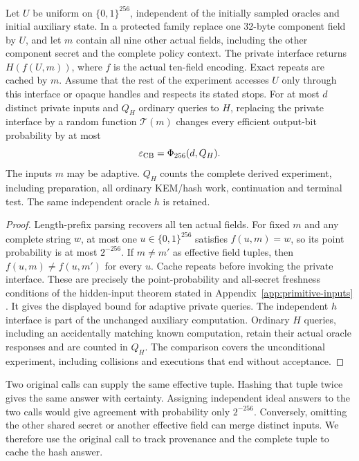 \begin{lemma}
\label{lem:cb-hidden-component}
Let $U$ be uniform on $\{0,1\}^{256}$, independent of the initially sampled
oracles and initial auxiliary state. In a protected family replace one
32-byte component field by $U$, and let $m$ contain all nine other actual
fields, including the other component secret and the complete policy
context. The private interface returns
$H(f(U,m))$, where $f$ is the actual ten-field encoding. Exact repeats are
cached by $m$. Assume that the rest of the experiment accesses $U$ only
through this interface or opaque handles and respects its stated stops.
For at most $d$ distinct private inputs and $Q_H$ ordinary queries to $H$,
replacing the private interface by a random function $\mathcal T(m)$
changes every efficient output-bit probability by at most
\begin{equation}
 \varepsilon_{\rm CB}=\Phi_{256}(d,Q_H).
 \label{eq:cb-hidden-cost}
\end{equation}
The inputs $m$ may be adaptive. $Q_H$ counts the complete derived
experiment, including preparation, all ordinary KEM/hash work, continuation
and terminal test. The same independent oracle $h$ is retained.
\end{lemma}
\begin{proof}
Length-prefix parsing recovers all ten actual fields. For fixed $m$ and any
complete string $w$, at most one $u\in\{0,1\}^{256}$ satisfies
$f(u,m)=w$, so its point probability is at most $2^{-256}$. If $m\ne m'$
as effective field tuples, then $f(u,m)\ne f(u,m')$ for every $u$.
Cache repeats before invoking the private interface. These are precisely
the point-probability and all-secret freshness conditions of the
hidden-input theorem stated in Appendix~\ref{app:primitive-inputs}
\cite[Theorem~2]{dfh2022}. It gives the displayed bound for adaptive
private queries. The independent $h$ interface is part of the unchanged
auxiliary computation. Ordinary $H$ queries, including an accidentally
matching known computation, retain their actual oracle responses and are
counted in $Q_H$. The comparison covers the unconditional experiment,
including collisions and executions that end without acceptance.
\end{proof}

Two original calls can supply the same effective tuple. Hashing that
tuple twice gives the same answer with certainty. Assigning independent
ideal answers to the two calls would give agreement with probability
only $2^{-256}$. Conversely, omitting the other shared secret or another
effective field can merge distinct inputs. We therefore use the original
call to track provenance and the complete tuple to cache the hash
answer.

